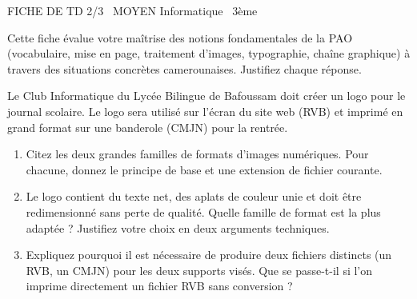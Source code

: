 \documentclass[11pt]{article}
\begin{document}
\begin{tcolorbox}[enhanced,colback=popink,colframe=popink,arc=10pt,boxrule=0pt,left=12pt,right=12pt,top=9pt,bottom=9pt]
{\color{white}\popxbold\small FICHE DE TD 2/3 \textbullet\ MOYEN \hfill Informatique \textbullet\ 3ème\par}
\end{tcolorbox}
\vspace{4pt}
\noindent Cette fiche évalue votre maîtrise des notions fondamentales de la PAO (vocabulaire, mise en page, traitement d'images, typographie, chaîne graphique) à travers des situations concrètes camerounaises. Justifiez chaque réponse.

\begin{exercice}
Le Club Informatique du Lycée Bilingue de Bafoussam doit créer un logo pour le journal scolaire. Le logo sera utilisé sur l'écran du site web (RVB) et imprimé en grand format sur une banderole (CMJN) pour la rentrée.
\begin{enumerate}
    \item Citez les deux grandes familles de formats d'images numériques. Pour chacune, donnez le principe de base et une extension de fichier courante.
    \item Le logo contient du texte net, des aplats de couleur unie et doit être redimensionné sans perte de qualité. Quelle famille de format est la plus adaptée ? Justifiez votre choix en deux arguments techniques.
    \item Expliquez pourquoi il est nécessaire de produire deux fichiers distincts (un RVB, un CMJN) pour les deux supports visés. Que se passe-t-il si l'on imprime directement un fichier RVB sans conversion ?
\end{enumerate}
\end{exercice}
\end{document}
